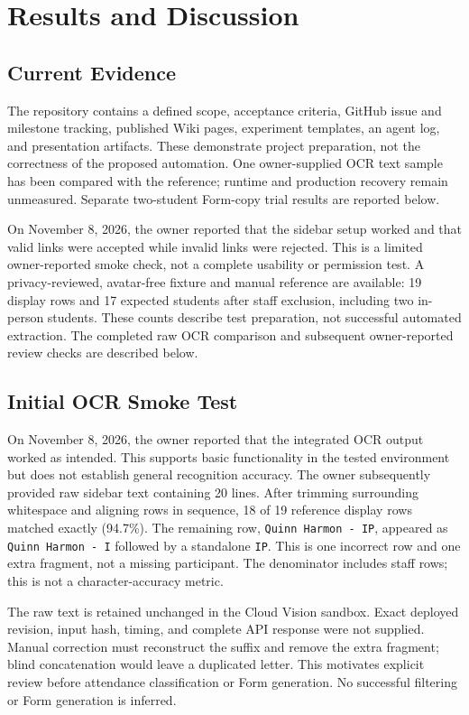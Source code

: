 \section{Results and Discussion}
\subsection{Current Evidence}
The repository contains a defined scope, acceptance criteria, GitHub issue and
milestone tracking, published Wiki pages, experiment templates, an agent log,
and presentation artifacts. These demonstrate project preparation, not the
correctness of the proposed automation. One owner-supplied OCR text sample has
been compared with the reference; runtime and production recovery remain
unmeasured. Separate two-student Form-copy trial results are reported below.

On November 8, 2026, the owner reported that the sidebar setup worked and that
valid links were accepted while invalid links were rejected. This is a limited
owner-reported smoke check, not a complete usability or permission test.
A privacy-reviewed, avatar-free fixture and manual reference are available:
19 display rows and 17 expected students after staff exclusion, including two
in-person students. These counts describe test preparation, not successful
automated extraction. The completed raw OCR comparison and subsequent
owner-reported review checks are described below.

\subsection{Initial OCR Smoke Test}
On November 8, 2026, the owner reported that the integrated OCR output worked
as intended. This supports basic functionality in the tested environment but
does not establish general recognition accuracy. The owner subsequently provided
raw sidebar text containing 20 lines. After trimming surrounding whitespace and
aligning rows in sequence, 18 of 19 reference display rows matched exactly
(94.7\%). The remaining row, \texttt{Quinn Harmon - IP}, appeared as
\texttt{Quinn Harmon - I} followed by a standalone \texttt{IP}. This is one
incorrect row and one extra fragment, not a missing participant. The denominator
includes staff rows; this is not a character-accuracy metric.

The raw text is retained unchanged in the Cloud Vision sandbox. Exact deployed
revision, input hash, timing, and complete API response were not supplied.
Manual correction must reconstruct the suffix and remove the extra fragment;
blind concatenation would leave a duplicated letter. This motivates explicit
review before attendance classification or Form generation. No successful
filtering or Form generation is inferred.

